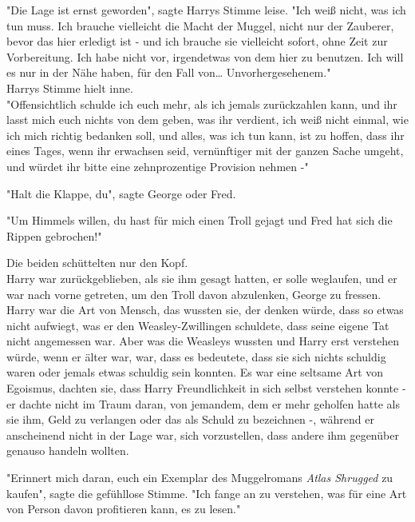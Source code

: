 {"Die Lage ist ernst geworden", sagte Harrys Stimme leise. "Ich weiß nicht, was ich tun muss. Ich brauche vielleicht die Macht der Muggel, nicht nur der Zauberer, bevor das hier erledigt ist - und ich brauche sie vielleicht sofort, ohne Zeit zur Vorbereitung. Ich habe nicht vor, irgendetwas von dem hier zu benutzen. Ich will es nur in der Nähe haben, für den Fall von… Unvorhergesehenem."\\ Harrys Stimme hielt inne.\\ "Offensichtlich schulde ich euch mehr, als ich jemals zurückzahlen kann, und ihr lasst mich euch nichts von dem geben, was ihr verdient, ich weiß nicht einmal, wie ich mich richtig bedanken soll, und alles, was ich tun kann, ist zu hoffen, dass ihr eines Tages, wenn ihr erwachsen seid, vernünftiger mit der ganzen Sache umgeht, und würdet ihr bitte eine zehnprozentige Provision nehmen -"

"Halt die Klappe, du", sagte George oder Fred.

"Um Himmels willen, du hast für mich einen Troll gejagt und Fred hat sich die Rippen gebrochen!"

Die beiden schüttelten nur den Kopf.\\ Harry war zurückgeblieben, als sie ihm gesagt hatten, er solle weglaufen, und er war nach vorne getreten, um den Troll davon abzulenken, George zu fressen. Harry war die Art von Mensch, das wussten sie, der denken würde, dass so etwas nicht aufwiegt, was er den Weasley-Zwillingen schuldete, dass seine eigene Tat nicht angemessen war. Aber was die Weasleys wussten und Harry erst verstehen würde, wenn er älter war, war, dass es bedeutete, dass sie sich nichts schuldig waren oder jemals etwas schuldig sein konnten. Es war eine seltsame Art von Egoismus, dachten sie, dass Harry Freundlichkeit in sich selbst verstehen konnte - er dachte nicht im Traum daran, von jemandem, dem er mehr geholfen hatte als sie ihm, Geld zu verlangen oder das als Schuld zu bezeichnen -, während er anscheinend nicht in der Lage war, sich vorzustellen, dass andere ihm gegenüber genauso handeln wollten.

"Erinnert mich daran, euch ein Exemplar des Muggelromans \emph{Atlas Shrugged} zu kaufen", sagte die gefühllose Stimme. "Ich fange an zu verstehen, was für eine Art von Person davon profitieren kann, es zu lesen."

}
